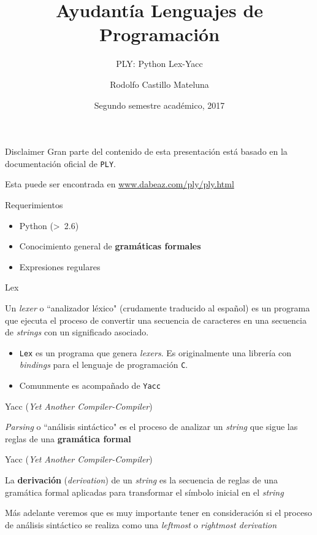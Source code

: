 \documentclass[pdf]{beamer}
\title{Ayudantía Lenguajes de Programación}
\subtitle{PLY: Python Lex-Yacc}
\author{Rodolfo Castillo Mateluna}
\institute{U. Técnica Federico Santa María}
\date{Segundo semestre académico, 2017}
\begin{document}
	\begin{frame}
		\titlepage
	\end{frame}
	
	
	\begin{frame}{Disclaimer}
	\justifying
		Gran parte del contenido de esta presentación está basado en la documentación oficial de \texttt{PLY}.
		
		\medskip
		Esta puede ser encontrada en \href{www.dabeaz.com/ply/ply.html}{www.dabeaz.com/ply/ply.html}
	\end{frame}
	
	
	\begin{frame}{Requerimientos}
	\begin{itemize}
		\item Python (\textgreater\ 2.6)
		\item Conocimiento general de \textbf{gramáticas formales}
		\item Expresiones regulares
	\end{itemize}
	\end{frame}
	
	\begin{frame}{Lex}
		\begin{definition}
			Un \emph{lexer} o ``analizador léxico" (crudamente traducido al español) es un programa que ejecuta el proceso de convertir una secuencia de caracteres en una secuencia de \emph{strings} con un significado asociado.
		\end{definition}
		
		\begin{itemize}
			\item\texttt{Lex} es un programa que genera \emph{lexers}. Es originalmente una librería con \emph{bindings} para el lenguaje de programación \texttt{C}.
			\item Comunmente es acompañado de \texttt{Yacc}
		\end{itemize}
	\end{frame}
	
	\begin{frame}{Yacc (\emph{Yet Another Compiler-Compiler})}
		\begin{definition}
			\emph{Parsing} o ``análisis sintáctico" es el proceso de analizar un \emph{string} que sigue las reglas de una \textbf{gramática formal}
		\end{definition}
	\end{frame}
	
	\begin{frame}{Yacc (\emph{Yet Another Compiler-Compiler})}
		\begin{definition}
			La \textbf{derivación} (\emph{derivation}) de un \emph{string} es la secuencia de reglas de una gramática formal aplicadas para transformar el símbolo inicial en el \emph{string}
		\end{definition}
		\justifying
		Más adelante veremos que es muy importante tener en consideración si el proceso de análisis sintáctico se realiza como una \emph{leftmost} o \emph{rightmost derivation}
	\end{frame}
	
\end{document}
